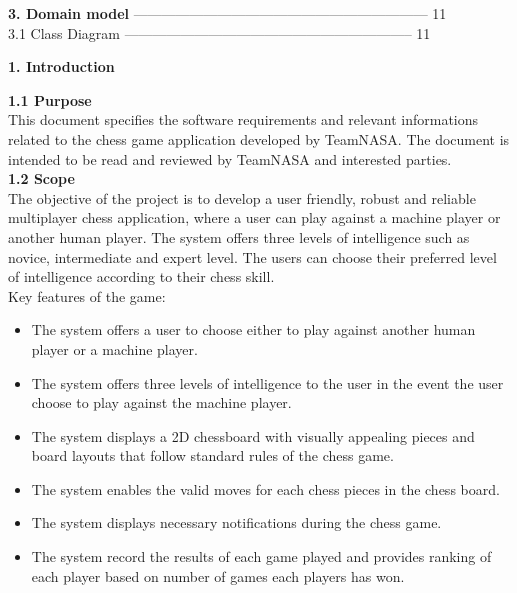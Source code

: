 \documentclass{article}
\begin{document}
\begin{flushleft}
\textbf{3.	Domain model}  --------------------------------------------------------------- 11\\
3.1 \hspace{0.5cm}Class Diagram  --------------------------------------------------------------	11\\

\newpage

\begin{Large}\textbf{1.	Introduction}\\
\end{Large}
\vspace{3mm}
\textbf{1.1	Purpose}\\
\vspace{1mm}
This document specifies the software requirements and relevant informations related to the chess game application developed by TeamNASA. The document is intended to be read and reviewed by TeamNASA and interested parties.\\
\vspace{5mm}
\textbf{1.2	Scope}\\
\vspace{1mm}
The objective of the project is to develop a user friendly, robust and reliable multiplayer chess application, where a user can play against a machine player or another human player. The system offers three levels of intelligence such as novice, intermediate and expert level. The users can choose their preferred level of intelligence according to their chess skill.\\
\vspace{1mm}
Key features of the game:
\begin{itemize}
	

\item The system offers a user to choose either to play against another human player or a machine player.
\item The system offers three levels of intelligence to the user in the event the user choose to play against the machine player.
\item The system displays a 2D chessboard with visually appealing pieces and board layouts that follow standard rules of the chess game.
\item The system enables the valid moves for each chess pieces in the chess board.
\item The system displays necessary notifications during the chess game.   
\item The system record the results of each game played and provides ranking of each player based on number of games each players has won.



\end{itemize}
\end{flushleft}
\end{document}
